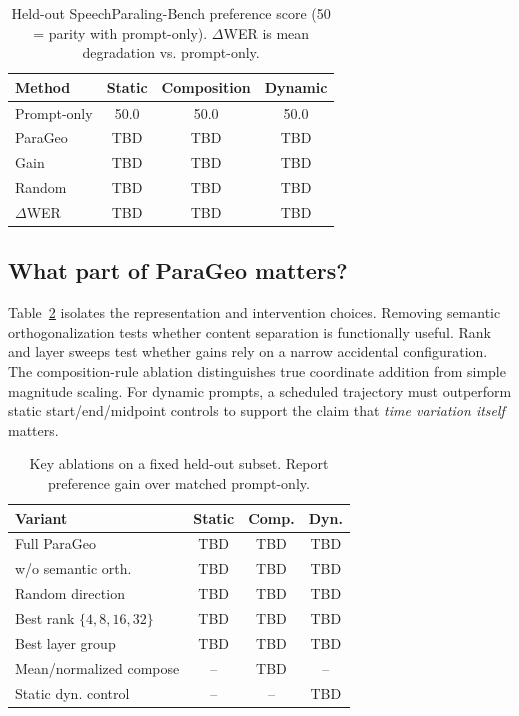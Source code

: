 \documentclass{article}
\newcommand{\StaticPref}{TBD}
\newcommand{\StaticGain}{TBD}
\newcommand{\CompPref}{TBD}
\newcommand{\CompGain}{TBD}
\newcommand{\DynPref}{TBD}
\newcommand{\DynGain}{TBD}
\newcommand{\RandomStatic}{TBD}
\newcommand{\RandomComp}{TBD}
\newcommand{\RandomDyn}{TBD}
\newcommand{\StaticWER}{TBD}
\newcommand{\CompWER}{TBD}
\newcommand{\DynWER}{TBD}
\newcommand{\BestRank}{TBD}
\newcommand{\BestLayer}{TBD}
\newcommand{\NoOrthGain}{TBD}
\newcommand{\DynStaticGain}{TBD}
\begin{document}
\begin{table}[t]
\centering
\caption{Held-out SpeechParaling-Bench preference score (50 = parity with prompt-only). $\Delta$WER is mean degradation vs. prompt-only.}
\label{tab:main}
\setlength{\tabcolsep}{3.2pt}
\begin{tabular}{lccc}
\toprule
Method & Static & Composition & Dynamic \\
\midrule
Prompt-only & 50.0 & 50.0 & 50.0 \\
ParaGeo & \StaticPref & \CompPref & \DynPref \\
Gain & \StaticGain & \CompGain & \DynGain \\
Random & \RandomStatic & \RandomComp & \RandomDyn \\
\midrule
$\Delta$WER & \StaticWER & \CompWER & \DynWER \\
\bottomrule
\end{tabular}
\end{table}

\subsection{What part of ParaGeo matters?}
Table~\ref{tab:ablation} isolates the representation and intervention choices. Removing semantic orthogonalization tests whether content separation is functionally useful. Rank and layer sweeps test whether gains rely on a narrow accidental configuration. The composition-rule ablation distinguishes true coordinate addition from simple magnitude scaling. For dynamic prompts, a scheduled trajectory must outperform static start/end/midpoint controls to support the claim that \emph{time variation itself} matters.

\begin{table}[t]
\centering
\caption{Key ablations on a fixed held-out subset. Report preference gain over matched prompt-only.}
\label{tab:ablation}
\setlength{\tabcolsep}{3.0pt}
\begin{tabular}{lccc}
\toprule
Variant & Static & Comp. & Dyn. \\
\midrule
Full ParaGeo & TBD & TBD & TBD \\
w/o semantic orth. & \NoOrthGain & TBD & TBD \\
Random direction & TBD & TBD & TBD \\
Best rank $\{4,8,16,32\}$ & \BestRank & \BestRank & \BestRank \\
Best layer group & \BestLayer & \BestLayer & \BestLayer \\
Mean/normalized compose & -- & TBD & -- \\
Static dyn. control & -- & -- & \DynStaticGain \\
\bottomrule
\end{tabular}
\end{table}
\end{document}
